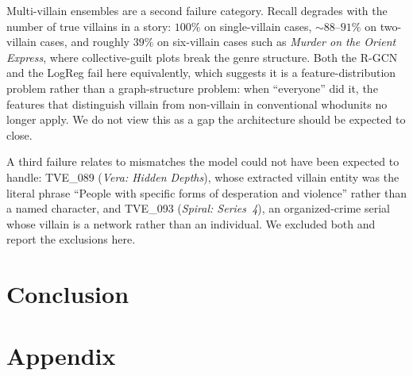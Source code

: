 \documentclass[11pt]{article}
\begin{document}
Multi-villain ensembles are a second failure category. Recall degrades with the number of true villains in a story: $100\%$ on single-villain cases, $\sim\!88$--$91\%$ on two-villain cases, and roughly $39\%$ on six-villain cases such as \emph{Murder on the Orient Express}, where collective-guilt plots break the genre structure. Both the R-GCN and the LogReg fail here equivalently, which suggests it is a feature-distribution problem rather than a graph-structure problem: when ``everyone'' did it, the features that distinguish villain from non-villain in conventional whodunits no longer apply. We do not view this as a gap the architecture should be expected to close.

A third failure relates to mismatches the model could not have been expected to handle: TVE\_089 (\emph{Vera: Hidden Depths}), whose extracted villain entity was the literal phrase ``People with specific forms of desperation and violence'' rather than a named character, and TVE\_093 (\emph{Spiral: Series~4}), an organized-crime serial whose villain is a network rather than an individual. We excluded both and report the exclusions here.






\section{Conclusion}

\section{Appendix}






\end{document}
